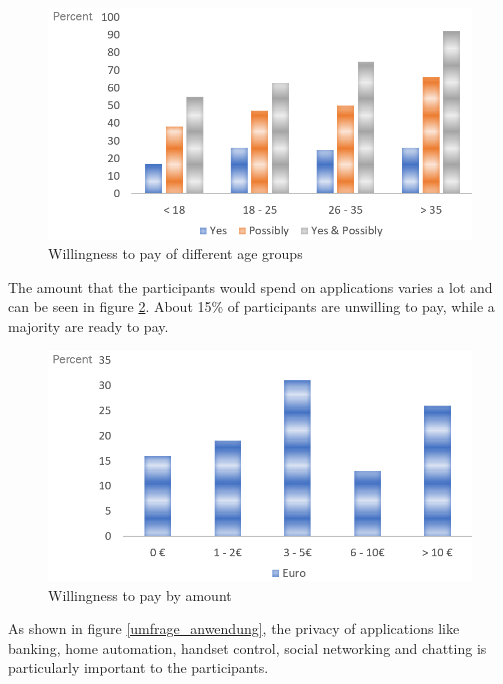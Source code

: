 \begin{figure}[h]
	\centering
	\includegraphics[width=0.9\linewidth]{Picture/umfrage_geld_gruppen}
	\caption[Willingness to pay of different age groups]{Willingness to pay of different age groups}
	\label{fig:umfrage_geld_gruppen}
\end{figure}

The amount that the participants would spend on applications varies a lot and can be seen in figure \ref{fig:umfrage_betrag}. About 15\% of participants are unwilling to pay, while a majority are ready to pay.

\begin{figure}[h]
	\centering
	\includegraphics[width=0.9\linewidth]{Picture/umfrage_betrag}
	\caption[Willingness to pay by amount]{Willingness to pay by amount}
	\label{fig:umfrage_betrag}
\end{figure}

As shown in figure \ref{umfrage_anwendung}, the privacy of applications like banking, home automation, handset control, social networking and chatting is particularly important to the participants.


